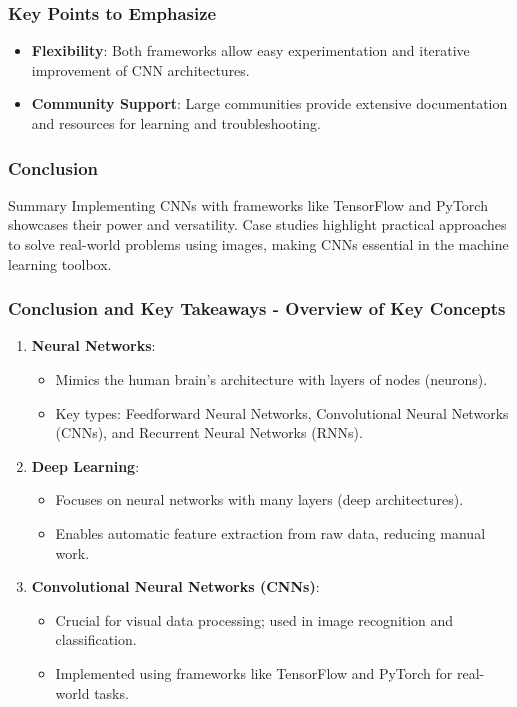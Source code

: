 \documentclass[aspectratio=169]{beamer}
\begin{document}
\begin{frame}
    \frametitle{Key Points to Emphasize}
    \begin{itemize}
        \item \textbf{Flexibility}: Both frameworks allow easy experimentation and iterative improvement of CNN architectures.
        \item \textbf{Community Support}: Large communities provide extensive documentation and resources for learning and troubleshooting.
    \end{itemize}
\end{frame}

\begin{frame}
    \frametitle{Conclusion}
    \begin{block}{Summary}
        Implementing CNNs with frameworks like TensorFlow and PyTorch showcases their power and versatility. 
        Case studies highlight practical approaches to solve real-world problems using images, making CNNs essential in the machine learning toolbox.
    \end{block}
\end{frame}

\begin{frame}[fragile]
  \frametitle{Conclusion and Key Takeaways - Overview of Key Concepts}
  \begin{enumerate}
    \item \textbf{Neural Networks}:
      \begin{itemize}
        \item Mimics the human brain's architecture with layers of nodes (neurons).
        \item Key types: Feedforward Neural Networks, Convolutional Neural Networks (CNNs), and Recurrent Neural Networks (RNNs).
      \end{itemize}
    
    \item \textbf{Deep Learning}:
      \begin{itemize}
        \item Focuses on neural networks with many layers (deep architectures).
        \item Enables automatic feature extraction from raw data, reducing manual work.
      \end{itemize}
    
    \item \textbf{Convolutional Neural Networks (CNNs)}:
      \begin{itemize}
        \item Crucial for visual data processing; used in image recognition and classification.
        \item Implemented using frameworks like TensorFlow and PyTorch for real-world tasks.
      \end{itemize}
  \end{enumerate}
\end{frame}
\end{document}
